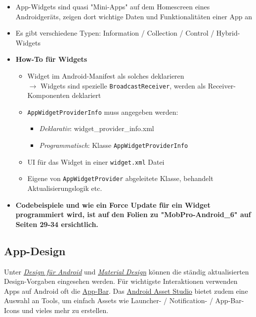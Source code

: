 \documentclass[a4paper]{article}
\begin{document}
	\begin{itemize}
		
		\item App-Widgets sind quasi "Mini-Apps" auf dem Homescreen eines Androidgeräts, zeigen dort wichtige Daten und Funktionalitäten einer App an
		
		\item Es gibt verschiedene Typen: Information / Collection / Control / Hybrid-Widgets
		
		\item \textbf{How-To für Widgets}
		\begin{itemize}
			
			\item Widget im Android-Manifest als solches deklarieren\\
					$\rightarrow$ Widgets sind spezielle \texttt{BroadcastReceiver}, werden als Receiver-Komponenten deklariert
					
			\item \texttt{AppWidgetProviderInfo} muss angegeben werden:
			\begin{itemize}
				\item \textit{Deklarativ}: widget\_provider\_info.xml
				\item \textit{Programmatisch}: Klasse \texttt{AppWidgetProviderInfo}
			\end{itemize}
			
			\item UI für das Widget in einer \texttt{widget.xml} Datei
			
			\item Eigene von \texttt{AppWidgetProvider} abgeleitete Klasse, behandelt Aktualisierungslogik etc.\\
			
		\end{itemize}	
	
		\item \textbf{Codebeispiele und wie ein Force Update für ein Widget programmiert wird, ist auf den Folien zu "MobPro-Android\_6" auf Seiten 29-34 ersichtlich.}
		
	\end{itemize}
	
	\newpage
	
	\subsection{App-Design}
	
	Unter \href{https://developer.android.com/design/}{\textit{Design für Android}} und \href{https://material.io/design/}{\textit{Material Design}} können die ständig aktualisierten Design-Vorgaben eingesehen werden. 
	Für wichtigste Interaktionen verwenden Apps auf Android oft die \href{https://developer.android.com/training/appbar/index.html}{App-Bar}.
	Das \href{https://romannurik.github.io/AndroidAssetStudio/index.html}{Android Asset Studio} bietet zudem eine Auswahl an Tools, um einfach Assets wie Launcher- / Notification- / App-Bar-Icons und vieles mehr zu erstellen.
	
\end{document}
